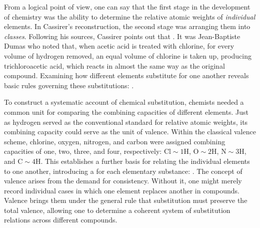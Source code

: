 \documentclass[submitted,12pt]{article}
\renewcommand{\SF}[2]{\citep[#1/#2]{Cassirer1910}}
\begin{document}
From a logical point of view, one can say that the first stage in the development of chemistry was the ability to determine the relative atomic weights of \emph{individual} elements. In Cassirer's reconstruction, the second stage was arranging them into \emph{classes}. Following his sources, Cassirer points out that  \SF{281}{211}. It was Jean-Baptiste Dumas who noted that, when acetic acid is treated with chlorine, for every volume of hydrogen removed, an equal volume of chlorine is taken up, producing trichloroacetic acid, which reacts in almost the same way as the original compound. Examining how different elements substitute for one another reveals basic rules governing these substitutions:  \SF{281}{211}. 

To construct a systematic account of chemical substitution, chemists needed a common unit for comparing the combining capacities of different elements. Just as hydrogen served as the conventional standard for relative atomic weights, its combining capacity could serve as the unit of valence. Within the classical valence scheme, chlorine, oxygen, nitrogen, and carbon were assigned combining capacities of one, two, three, and four, respectively: $\mathrm{Cl}\sim 1\mathrm{H}$, $\mathrm{O}\sim 2\mathrm{H}$, $\mathrm{N}\sim 3\mathrm{H}$, and $\mathrm{C}\sim 4\mathrm{H}$. This establishes a further basis for relating the individual elements to one another, introducing a  for each elementary substance:  \SF{281}{211}. The concept of valence arises from the demand for consistency.  Without it, one might merely record individual cases in which one element replaces another in compounds. Valence brings them under the general rule that substitution must preserve the total valence, allowing one to determine a coherent system of substitution relations across different compounds.
\end{document}
